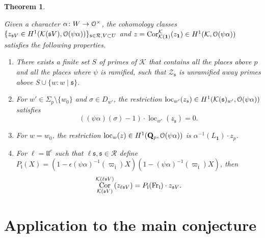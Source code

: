 \documentclass[leqno]{amsart}
\newtheorem{thm}{Theorem}[section]
\theoremstyle{definition}
\theoremstyle{remark}
\newcommand{\id}{\mathbf{1}}
\newcommand{\eo}{\EuScript{O}}
\newcommand{\Qp}{\mathbf{Q}_p}
\DeclareMathOperator{\Cor}{Cor}
\newcommand{\Fr}{\textnormal{Fr}} %
\newcommand{\fl}{\mathfrak{l}}
\newcommand{\fs}{\mathfrak{s}}
\newcommand{\K}{{\mathcal{K}}} %
\newcommand{\bl}{{\bar{\fl}}}
\DeclareMathOperator{\loc}{loc}
\begin{document}
\begin{thm}\label{thm:eu}

Given a character $\alpha\colon W\to \eo^\times$,
the cohomology classes
$\{ z_{\fs V}\in H^1(\K(\fs V), \eo(\psi\alpha))\}
_{\fs\in \mathcal{R},V\subset U}$
and $z=\Cor_{\K(\id)}^{\K}(z_\id)\in H^1(\K, \eo(\psi\alpha))$
satisfies the following properties. 


\begin{enumerate}
    \item There exists a finite set $S$ of primes of $\K$
    that contains all the places above $p$ and all the 
    places where $\psi$ is ramified, such that 
    $\mathcal{Z}_{\fs}$ is unramified away primes above
    $S\cup \{w\colon w\mid \fs\}$.
    \item For $w'\in \Sigma_p\setminus\{w_0\}$
    and $\sigma\in D_{w'}$, the restriction
    $\loc_{w'}(z_\fs)\in H^1(\K(\fs)_{w'}, \eo(\psi\alpha))$
    satisfies 
    \[
        ((\psi\alpha)(\sigma)-1)\cdot \loc_{w'}(z_\fs)=0.
    \]
    \item For $w=w_0$, the restriction 
    $\loc_{w}(z)\in H^1(\Qp, \eo(\psi\alpha))$
    is $\alpha^{-1}(L_\id)\cdot z_{p}$.
    \item
    For $\ell=\fl\fl^c$ such that $\ell\fs,\fs\in \mathcal{R}$ define
    $P_\fl(X)=(1-\epsilon(\psi\alpha)^{-1}(\varpi_\bl)X)
    (1-(\psi\alpha)^{-1}(\varpi_\bl)X)$, then
    \begin{equation}\label{eq:Pl}
        \Cor_{\K(\fs V)}^{\K(\ell\fs V)}(z_{\ell\fs V})=
        P_\fl(\Fr_\fl)\cdot z_{\fs V}.
    \end{equation}
\end{enumerate}

\end{thm}

\section{Application to the main conjecture}
\end{document}
